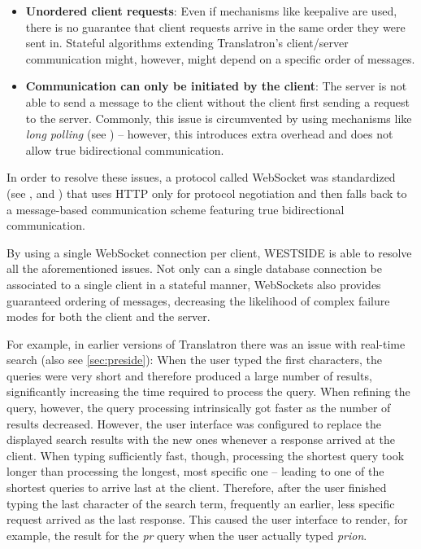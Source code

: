 \documentclass[a4paper, 12pt, twoside, reqn]{report}
\numberwithin{figure}{chapter}
\newtheorem[L]{boxedDefinition}{Definition}
\newtheorem[L]{boxedExample}{Example}
\begin{document}
\begin{itemize}
 \item \textbf{Unordered client requests}: Even if mechanisms like keepalive are used, there is no guarantee that client requests arrive in the same order they were sent in. Stateful algorithms extending Translatron's client/server communication might, however, might depend on a specific order of messages.
 
 \item \textbf{Communication can only be initiated by the client}: The server is not able to send a message to the client without the client first sending a request to the server. Commonly, this issue is circumvented by using mechanisms like \textit{long polling} (see \cite{loreto2011known}) -- however, this introduces extra overhead and does not allow true bidirectional communication.
 
\end{itemize}

In order to resolve these issues, a protocol called WebSocket was standardized (see \cite{fette2011websocket}, \cite{hickson2011websocket} and \cite{rfc6955}) that uses HTTP only for protocol negotiation and then falls back to a message-based communication scheme featuring true bidirectional communication.

By using a single WebSocket connection per client, WESTSIDE is able to resolve all the aforementioned issues. Not only can a single database connection be associated to a single client in a stateful manner, WebSockets also provides guaranteed ordering of messages, decreasing the likelihood of complex failure modes for both the client and the server.

For example, in earlier versions of Translatron there was an issue with real-time search (also see \ref{sec:preside}): When the user typed the first characters, the queries were very short and therefore produced a large number of results, significantly increasing the time required to process the query. When refining the query, however, the query processing intrinsically got faster as the number of results decreased. However, the user interface was configured to replace the displayed search results with the new ones whenever a response arrived at the client. When typing sufficiently fast, though, processing the shortest query took longer than processing the longest, most specific one -- leading to one of the shortest queries to arrive last at the client. Therefore, after the user finished typing the last character of the search term, frequently an earlier, less specific request arrived as the last response. This caused the user interface to render, for example, the result for the \textit{pr} query when the user actually typed \textit{prion}.
\end{document}
